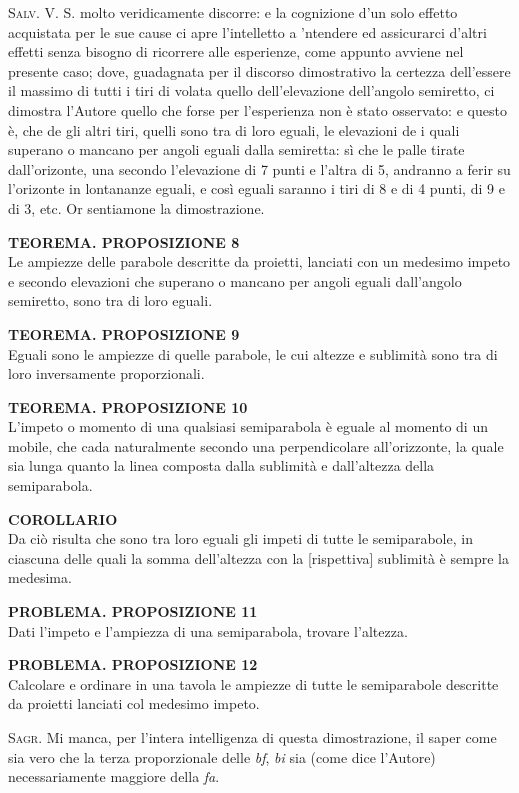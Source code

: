 \documentclass[11pt,twoside,openany]{book}
\newcommand{\speaker}[1]{\textcolor{rubric}{\textsc{#1}}\space}
\begin{document}
\speaker{Salv.} V. S. molto veridicamente discorre: e la cognizione d'un solo effetto acquistata per le sue cause ci apre l'intelletto a 'ntendere ed assicurarci d'altri effetti senza bisogno di ricorrere alle esperienze, come appunto avviene nel presente caso; dove, guadagnata per il discorso dimostrativo la certezza dell'essere il massimo di tutti i tiri di volata quello dell'elevazione dell'angolo semiretto, ci dimostra l'Autore quello che forse per l'esperienza non è stato osservato: e questo è, che de gli altri tiri, quelli sono tra di loro eguali, le elevazioni de i quali superano o mancano per angoli eguali dalla semiretta: sì che le palle tirate dall'orizonte, una secondo l'elevazione di 7 punti e l'altra di 5, andranno a ferir su l'orizonte in lontananze eguali, e così eguali saranno i tiri di 8 e di 4 punti, di 9 e di 3, etc. Or sentiamone la dimostrazione.

\textbf{TEOREMA. PROPOSIZIONE 8}\\ Le ampiezze delle parabole descritte da proietti, lanciati con un medesimo impeto e secondo elevazioni che superano o mancano per angoli eguali dall'angolo semiretto, sono tra di loro eguali.

\textbf{TEOREMA. PROPOSIZIONE 9}\\ Eguali sono le ampiezze di quelle parabole, le cui altezze e sublimità sono tra di loro inversamente proporzionali.

\textbf{TEOREMA. PROPOSIZIONE 10}\\ L'impeto o momento di una qualsiasi semiparabola è eguale al momento di un mobile, che cada naturalmente secondo una perpendicolare all'orizzonte, la quale sia lunga quanto la linea composta dalla sublimità e dall'altezza della semiparabola.

\textbf{COROLLARIO}\\ Da ciò risulta che sono tra loro eguali gli impeti di tutte le semiparabole, in ciascuna delle quali la somma dell'altezza con la [rispettiva] sublimità è sempre la medesima.

\textbf{PROBLEMA. PROPOSIZIONE 11}\\ Dati l'impeto e l'ampiezza di una semiparabola, trovare l'altezza.

\textbf{PROBLEMA. PROPOSIZIONE 12}\\ Calcolare e ordinare in una tavola le ampiezze di tutte le semiparabole descritte da proietti lanciati col medesimo impeto.

\speaker{Sagr.} Mi manca, per l'intera intelligenza di questa dimostrazione, il saper come sia vero che la terza proporzionale delle \emph{bf}, \emph{bi} sia (come dice l'Autore) necessariamente maggiore della \emph{fa}.
\end{document}
